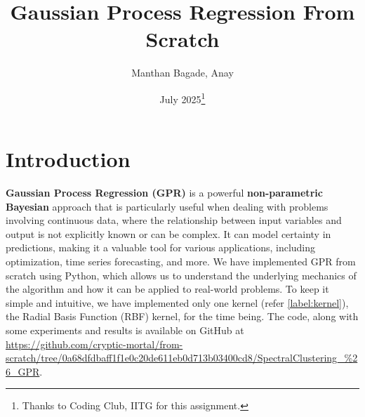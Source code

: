 \documentclass{article}
\title{Gaussian Process Regression From Scratch}
\author{Manthan Bagade, Anay}
\date{July 2025\thanks{Thanks to Coding Club, IITG for this assignment.}}
\begin{document}
\maketitle

\section{Introduction}
\label{sec:introduction}
\textbf{Gaussian Process Regression (GPR)} is a powerful \textbf{non-parametric Bayesian} approach that is particularly useful when dealing with problems involving continuous data, where the relationship between input variables and output is not explicitly known or can be complex. It can model certainty in predictions, making it a valuable tool for various applications, including optimization, time series forecasting, and more. \newline
We have implemented GPR from scratch using Python, which allows us to understand the underlying mechanics of the algorithm and how it can be applied to real-world problems. To keep it simple and intuitive, we have implemented only one kernel (refer \autoref{label:kernel}), the Radial Basis Function (RBF) kernel, for the time being. The code, along with some experiments and results is available on GitHub at \url{https://github.com/cryptic-mortal/from-scratch/tree/0a68dfdbaff1f1e0c20de611eb0d713b03400cd8/SpectralClustering_%26_GPR}.
\end{document}
